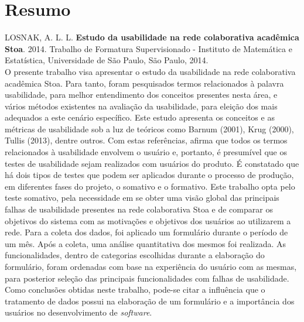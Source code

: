 \documentclass[11pt,twoside,a4paper]{book}
\begin{document}
\chapter*{Resumo}

\noindent LOSNAK, A. L. L. \textbf{Estudo da usabilidade na rede colaborativa acadêmica Stoa}. 
2014.
Trabalho de Formatura Supervisionado - Instituto de Matemática e Estatística,
Universidade de São Paulo, São Paulo, 2014.
\\

O presente trabalho visa apresentar o estudo da usabilidade na rede colaborativa acadêmica Stoa. Para tanto, foram pesquisados termos relacionados à palavra usabilidade, para melhor entendimento dos conceitos presentes nesta área, e vários métodos existentes na avaliação da usabilidade, para eleição dos mais adequados a este cenário específico. 
Este estudo apresenta os conceitos e as métricas de usabilidade sob a luz de teóricos como Barnum (2001), Krug (2000), Tullis (2013), dentre outros. Com estas referências, afirma que todos os termos relacionados à usabilidade envolvem o usuário e, portanto, é presumível que os testes de usabilidade sejam realizados com usuários do produto. 
É constatado que há dois tipos de testes que podem ser aplicados durante o processo de produção, em diferentes fases do projeto, o somativo e o formativo. Este trabalho opta pelo teste somativo, pela necessidade em se obter uma visão global das principais falhas de usabilidade presentes na rede colaborativa Stoa e de comparar os objetivos do sistema com as motivações e objetivos dos usuários ao utilizarem a rede. 
Para a coleta dos dados, foi aplicado um formulário durante o período de um mês. Após a coleta, uma análise quantitativa dos mesmos foi realizada. As funcionalidades, dentro de categorias escolhidas durante a elaboração do formulário, foram ordenadas com base na experiência do usuário com as mesmas, para posterior seleção das principais funcionalidades com falhas de usabilidade. Como conclusões obtidas neste trabalho, pode-se citar a influência que o tratamento de dados possui na elaboração de um formulário e a importância dos usuários no desenvolvimento de \emph{software}.
\\
\end{document}
